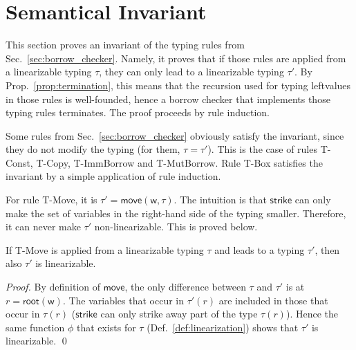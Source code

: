 \section{Semantical Invariant}\label{sec:invariant}

This section proves an invariant of the typing rules
from Sec.~\ref{sec:borrow_checker}. Namely, it proves that
if those rules are applied from a linearizable typing $\tau$,
they can only lead to a linearizable typing $\tau'$.
By Prop.~\ref{prop:termination}, this means that the recursion used for
typing leftvalues in those rules is well-founded,
hence a borrow checker that implements those typing rules terminates.
The proof proceeds by rule induction.

Some rules from Sec.~\ref{sec:borrow_checker} obviously satisfy the invariant,
since they do not modify the typing (for them, $\tau=\tau'$).
This is the case of rules
\textsf{T-Const}, \textsf{T-Copy}, \textsf{T-ImmBorrow} and
\textsf{T-MutBorrow}.
Rule \textsf{T-Box} satisfies the invariant by a simple application of
rule induction.

For rule \textsf{T-Move}, it is $\tau'=\mathsf{move}(\mathsf{w},\tau)$.
The intuition is that
$\mathsf{strike}$ can only make the set of variables in the right-hand side
of the typing smaller. Therefore, it can never make $\tau'$
non-linearizable. This is proved below.

\begin{lemma}\label{lem:move_invariant}
  If \textsf{T-Move} is applied from a linearizable typing $\tau$
  and leads to a typing $\tau'$, then also $\tau'$ is linearizable.
\end{lemma}
\begin{proof}
  By definition of $\mathsf{move}$, the only
  difference between $\tau$ and $\tau'$ is at $r=\mathsf{root}(\mathsf{w})$.
  The variables that occur in $\tau'(r)$ are included in those that occur
  in $\tau(r)$ ($\mathsf{strike}$ can only strike away part of the type $\tau(r)$).
  Hence the same function $\phi$ that exists for $\tau$ (Def.~\ref{def:linearization})
  shows that $\tau'$ is linearizable.
  \qed
\end{proof}

